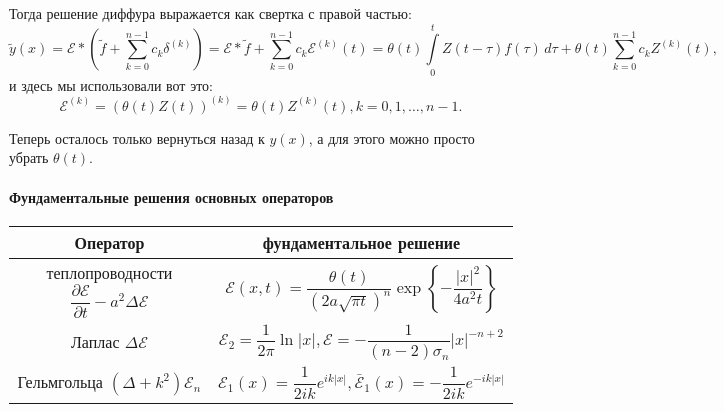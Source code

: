 Тогда решение диффура выражается как свертка с правой частью:
\[
  \tilde y(x) = \mathcal{E} * \left(\tilde f + \sum_{k=0}^{n-1} c_k \delta^{(k)}\right)
  = \mathcal{E} * \tilde f + \sum_{k=0}^{n-1} c_k \mathcal{E}^{(k)} (t)
  = \theta(t) \int\limits_0^{t} Z(t-\tau) f(\tau) \, d\tau
  + \theta(t) \sum_{k=0}^{n-1} c_k Z^{(k)} (t),
\]
и здесь мы использовали вот это:
\[
  \mathcal{E}^{(k)} = \left( \theta(t) Z(t) \right)^{(k)}
  = \theta(t) Z^{(k)} (t), k = 0, 1, \dots, n-1. 
\]

Теперь осталось только вернуться назад к $y(x)$, а для этого можно просто убрать $\theta(t)$.


\paragraph{Фундаментальные решения основных операторов}
\begin{center}
  \begin{tabular}{|c|c|}
    \hline
    Оператор & фундаментальное решение \\
    \hline
    теплопроводности $\dfrac{\partial \mathcal{E}}{\partial t} - a^2 \Delta \mathcal{E}$ &
    $\mathcal{E} (x, t) = \dfrac{\theta(t)}{(2a \sqrt{\pi t})^n} \exp \left\{ -\dfrac{|x|^2}{4a^2 t} \right\}$ \\
    
    \hline
    Лаплас $\Delta \mathcal{E}$ &
    $\mathcal{E}_2 = \dfrac{1}{2\pi} \ln |x|, \mathcal{E} = -\dfrac{1}{(n-2) \sigma_n} |x|^{-n+2}$ \\
    \hline 
    Гельмгольца $(\Delta + k^2) \mathcal{E}_n$ &
    $\mathcal{E}_1 (x) = \dfrac{1}{2ik} e^{ik |x|}, \bar{\mathcal{E}}_1 (x) = - \dfrac{1}{2ik} e^{-ik|x|}$ \\
    \hline
  \end{tabular}
\end{center}



